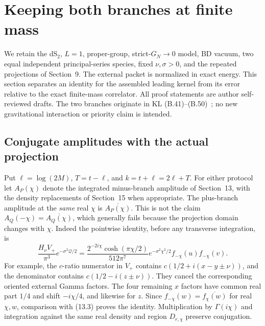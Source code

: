 \section{Keeping both branches at finite mass}
\label{sec:twobranch}
We retain the dS$_2$, $L=1$, proper-group, strict-$G_N\to0$ model,
BD vacuum, two equal independent principal-series species, fixed
$\nu,\sigma>0$, and the repeated projections of Section~9. The external
packet is normalized in exact energy. This section separates an identity
for the assembled leading kernel from its error relative to the exact
finite-mass correlator. All proof statements are author self-reviewed
drafts. The two branches originate in KL (B.41)--(B.50)~\cite{KL}; no
new gravitational interaction or priority claim is intended.

\subsection{Conjugate amplitudes with the actual projection}
Put $\ell=\log(2M)$, $T=t-\ell$, and $k=t+\ell=2\ell+T$.
For either protocol let $A_P(\chi)$ denote the integrated minus-branch
amplitude of Section~13, with the density replacements of Section~15
when appropriate. The plus-branch amplitude at the \emph{same}
real $\chi$ is $\overline{A_P(\chi)}$.
This is not the claim $A_Q(-\chi)=\overline{A_Q(\chi)}$, which generally
fails because the projection domain changes with $\chi$.
Indeed the pointwise identity, before any transverse integration, is
\begin{equation}
 \frac{H_\nu V_+}{\pi^3}e^{-\sigma^2\mathcal Q/2}
 =\frac{2^{-2i\chi}\cosh(\pi\chi/2)}{512\pi^7}
 e^{-\sigma^2\chi^2/2}f_{-\chi}(u)f_{-\chi}(v).
 \label{eq:tb-plus-factor}
\end{equation}
For example, the $c$-ratio numerator in $V_+$ contains
$c(1/2+i(x-y\pm\nu))$, and the denominator contains
$c(1/2-i(z\pm\nu))$. They cancel the corresponding oriented external
Gamma factors. The four remaining $x$ factors have common real part
$1/4$ and shift $-i\chi/4$, and likewise for $z$.
Since $f_{-\chi}(w)=\overline{f_\chi(w)}$ for real $\chi,w$, comparison
with (13.3) proves the identity. Multiplication by $\Gamma(i\chi)$
and integration against the same real density and region $D_{r,\chi}$
preserve conjugation.


